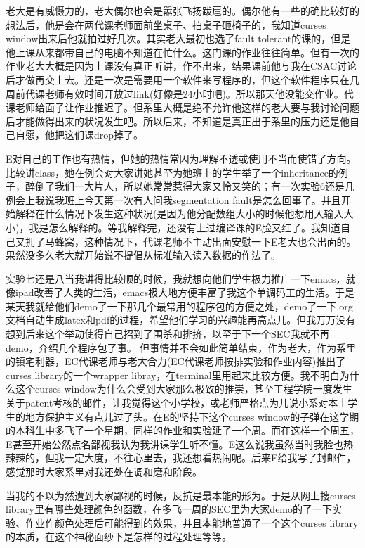 \documentclass[12pt]{book}
\begin{document}
老大是有威慑力的，老大偶尔也会是嚣张飞扬跋扈的。偶尔他有一些的确比较好的想法后，他是会在两代课老师面前坐桌子、拍桌子砸椅子的，我知道curses window出来后他就拍过好几次。其实老大最初也选了fault tolerant的课的，但是他上课从来都带自己的电脑不知道在忙什么。这门课的作业往往简单。但有一次的作业老大大概是因为上课没有真正听讲，作不出来，结果课前他与我在CSAC讨论后才做再交上去。还是一次是需要用一个软件来写程序的，但这个软件程序只在几周前代课老师有效时间开放过link(好像是24小时吧)。所以那天他没能交作业。代课老师给面子让作业推迟了。但系里大概是绝不允许他这样的老大要与我讨论问题后才能做得出来的状况发生吧。所以后来，不知道是真正出于系里的压力还是他自己自愿，他把这们课drop掉了。

E对自己的工作也有热情，但她的热情常因为理解不透或使用不当而使错了方向。比较讲class，她在例会对大家讲她甚至为她班上的学生举了一个inheritance的例子，醉倒了我们一大片人，所以她常常惹得大家又怜又笑的；有一次实验6还是几例会上我说我班上今天第一次有人问我segmentation fault是怎么回事了。并且开始解释在什么情况下发生这种状况(是因为他分配数组大小的时候他想用入输入大小)，我是怎么解释的。等我解释完，还没有上过编译课的E脸又红了。我知道自己又拥了马蜂窝，这种情况下，代课老师不主动出面安慰一下E老大也会出面的。果然没多久老大就开始说不提倡从标准输入读入数据的作法了。

实验七还是八当我讲得比较顺的时候，我就想向他们学生极力推广一下emacs，就像ipad改善了人类的生活，emacs极大地方便丰富了我这个单调码工的生活。于是某天我就给他们demo了一下那几个最常用的程序包的方便之处，demo了一下.org文档自动生成latex和pdf的过程，希望他们学习的兴趣能再高点儿。但我万万没有想到后来这个举动使得自己招到了围杀和排挤，以至于下一个SEC我就不再demo，介绍几个程序包了事。 但事情并不会如此简单结束，作为老大，作为系里的镇宅利器，EC代课老师与老大合力(EC代课老师按排实验和作业内容)推出了curses library的一个wrapper libray，在terminal里用起来比较方便。我不明白为什么这个curses window为什么会受到大家那么极致的推崇，甚至工程学院一度发生关于patent考核的邮件，让我觉得这个小学校，或老师严格点为儿说小系对本土学生的地方保护主义有点儿过了头。在E的坚持下这个curses window的子弹在这学期的本科生中多飞了一个星期，同样的作业和实验延了一个周。而在这样一个周五，E甚至开始公然点名鄙视我认为我讲课学生听不懂。E这么说我虽然当时我脸也热辣辣的，但我一定大度，不往心里去，我还想看热闹呢。后来E给我写了封邮件，感觉那时大家系里对我还处在调和磨和阶段。

当我的不以为然遭到大家鄙视的时候，反抗是最本能的形为。于是从网上搜curses library里有哪些处理颜色的函数，在多飞一周的SEC里为大家demo的了一下实验、作业作颜色处理后可能得到的效果，并且本能地普通了一个这个curses library 的本质，在这个神秘面纱下是怎样的过程处理等等。
\end{document}
